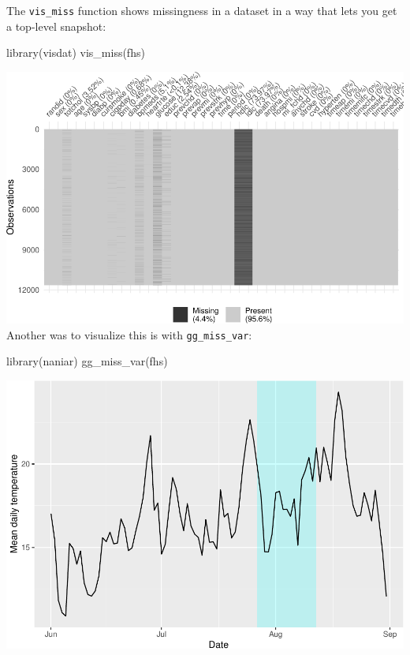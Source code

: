 \documentclass[
]{book}
\newenvironment{Shaded}{\begin{snugshade}}{\end{snugshade}}
\newcommand{\FunctionTok}[1]{\textcolor[rgb]{0.00,0.00,0.00}{#1}}
\newcommand{\NormalTok}[1]{#1}
\begin{document}
The \texttt{vis\_miss} function shows missingness in a dataset in a way that lets you
get a top-level snapshot:

\begin{Shaded}
\begin{Highlighting}[]
\FunctionTok{library}\NormalTok{(visdat)}
\FunctionTok{vis\_miss}\NormalTok{(fhs)}
\end{Highlighting}
\end{Shaded}

\includegraphics{adv_epi_analysis_files/figure-latex/unnamed-chunk-119-1.pdf}
Another was to visualize this is with \texttt{gg\_miss\_var}:

\begin{Shaded}
\begin{Highlighting}[]
\FunctionTok{library}\NormalTok{(naniar)}
\FunctionTok{gg\_miss\_var}\NormalTok{(fhs)}
\end{Highlighting}
\end{Shaded}

\includegraphics{adv_epi_analysis_files/figure-latex/unnamed-chunk-120-1.pdf}
\end{document}
